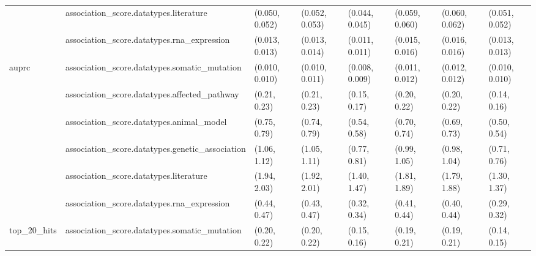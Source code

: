 \begin{table}[H]
{\begin{tabular}{llllllll}
 & association\_score.datatypes.literature & (0.050, 0.052) & (0.052, 0.053) & (0.044, 0.045) & (0.059, 0.060) & (0.060, 0.062) & (0.051, 0.052)\\

 & association\_score.datatypes.rna\_expression & (0.013, 0.013) & (0.013, 0.014) & (0.011, 0.011) & (0.015, 0.016) & (0.016, 0.016) & (0.013, 0.013)\\

\multirow{-6}{*}{\raggedright\arraybackslash auprc} & association\_score.datatypes.somatic\_mutation & (0.010, 0.010) & (0.010, 0.011) & (0.008, 0.009) & (0.011, 0.012) & (0.012, 0.012) & (0.010, 0.010)\\
\cmidrule{1-8}
 & association\_score.datatypes.affected\_pathway & (0.21, 0.23) & (0.21, 0.23) & (0.15, 0.17) & (0.20, 0.22) & (0.20, 0.22) & (0.14, 0.16)\\

 & association\_score.datatypes.animal\_model & (0.75, 0.79) & (0.74, 0.79) & (0.54, 0.58) & (0.70, 0.74) & (0.69, 0.73) & (0.50, 0.54)\\

 & association\_score.datatypes.genetic\_association & (1.06, 1.12) & (1.05, 1.11) & (0.77, 0.81) & (0.99, 1.05) & (0.98, 1.04) & (0.71, 0.76)\\

 & association\_score.datatypes.literature & (1.94, 2.03) & (1.92, 2.01) & (1.40, 1.47) & (1.81, 1.89) & (1.79, 1.88) & (1.30, 1.37)\\

 & association\_score.datatypes.rna\_expression & (0.44, 0.47) & (0.43, 0.47) & (0.32, 0.34) & (0.41, 0.44) & (0.40, 0.44) & (0.29, 0.32)\\

\multirow{-6}{*}{\raggedright\arraybackslash top\_20\_hits} & association\_score.datatypes.somatic\_mutation & (0.20, 0.22) & (0.20, 0.22) & (0.15, 0.16) & (0.19, 0.21) & (0.19, 0.21) & (0.14, 0.15)\\
\bottomrule
\end{tabular}}
\end{table}
